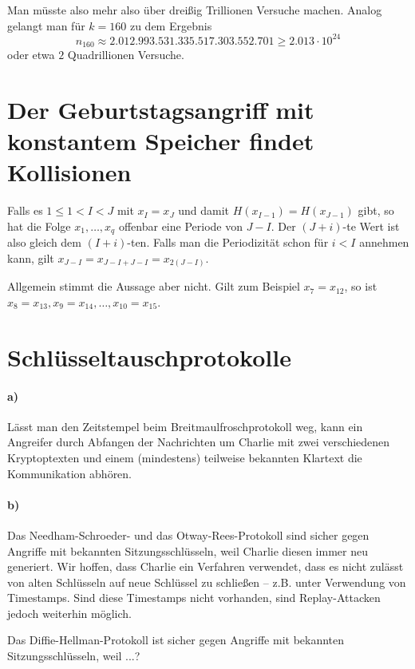 \documentclass{../crypto}
\begin{document}
Man müsste also mehr also über dreißig Trillionen
Versuche machen. Analog gelangt man für $k=160$ zu dem Ergebnis 
\begin{equation*}
   n_{160} \approx 2.012.993.531.335.517.303.552.701 \ge 2.013 \cdot 10^{24}
\end{equation*}
oder etwa $2$ Quadrillionen Versuche.

\section{Der Geburtstagsangriff mit konstantem Speicher findet Kollisionen}

Falls es $1 \le 1 < I < J$ mit $x_I = x_J$ und damit $H(x_{I-1}) = H(x_{J-1})$
gibt, so hat die Folge $x_1,\ldots,x_q$ offenbar eine Periode von $J - I$. Der
$(J+i)$-te Wert ist also gleich dem $(I+i)$-ten. Falls man die Periodizität schon für $i
< I$ annehmen kann, gilt $x_{J-I} = x_{J-I + J-I} = x_{2(J-I)}$.

Allgemein stimmt die Aussage aber nicht. Gilt zum Beispiel $x_7 = x_{12}$, so
ist $x_8 = x_{13}, x_9 = x_{14},\ldots,x_{10} = x_{15}$.

\section{Schlüsseltauschprotokolle}

\paragraph{a)} Lässt man den Zeitstempel beim Breitmaulfroschprotokoll weg, kann
ein Angreifer durch Abfangen der Nachrichten um Charlie mit zwei verschiedenen
Kryptoptexten und einem (mindestens) teilweise bekannten Klartext die
Kommunikation abhören.

\paragraph{b)} Das Needham-Schroeder- und das Otway-Rees-Protokoll 
sind sicher gegen Angriffe mit bekannten Sitzungsschlüsseln, weil Charlie diesen
immer neu generiert. Wir hoffen, dass Charlie ein Verfahren verwendet, dass es 
nicht zulässt von alten Schlüsseln auf neue Schlüssel zu schließen -- z.B.
unter Verwendung von Timestamps. Sind diese Timestamps nicht vorhanden, sind
Replay-Attacken jedoch weiterhin möglich.

Das Diffie-Hellman-Protokoll ist sicher gegen Angriffe mit bekannten 
Sitzungsschlüsseln, weil ...?
\end{document}
